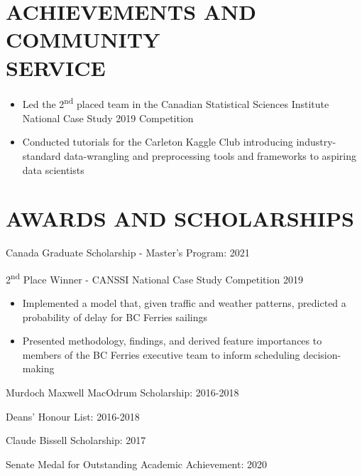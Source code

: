 \documentclass[margin]{res}
\newcommand{\ts}{\textsuperscript}
\begin{document}
\begin{resume}
\section{ACHIEVEMENTS AND \\COMMUNITY \\ SERVICE }
\begin{itemize} \itemsep -2pt
\item{Led the 2\ts{nd} placed team in the Canadian Statistical Sciences Institute National Case Study 2019 Competition}
\item{
      Conducted tutorials for the Carleton Kaggle Club introducing industry-standard data-wrangling and preprocessing tools and frameworks to aspiring data scientists 
      }
      
\end{itemize}


\section{AWARDS AND SCHOLARSHIPS}

\begin{itemize}
      \item{Canada Graduate Scholarship - Master's Program: 2021}
      \item{2\ts{nd} Place Winner - CANSSI National Case Study Competition 2019 \begin{itemize}
            \item{Implemented a model that, given traffic and weather patterns, predicted a probability of delay for BC Ferries sailings}
            \item{Presented methodology, findings, and derived feature importances to members of the BC Ferries executive team to inform scheduling decision-making}
      \end{itemize}
      \item{Murdoch Maxwell MacOdrum Scholarship: 2016-2018}
      \item{Deans' Honour List: 2016-2018}
      \item{Claude Bissell Scholarship: 2017}
      \item{Senate Medal for Outstanding Academic Achievement: 2020}
      }
      

\end{itemize}
\end{resume}
\end{document}
